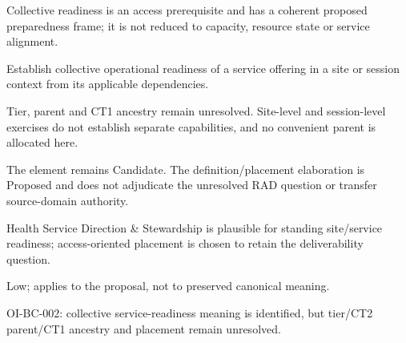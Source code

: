 Collective readiness is an access prerequisite and has a coherent proposed preparedness frame; it is not reduced to capacity, resource state or service alignment.



Establish collective operational readiness of a service offering in a site or session context from its applicable dependencies.



Tier, parent and CT1 ancestry remain unresolved. Site-level and session-level exercises do not establish separate capabilities, and no convenient parent is allocated here.



The element remains Candidate. The definition/\allowbreak{}placement elaboration is Proposed and does not adjudicate the unresolved RAD question or transfer source-domain authority.



Health Service Direction \& Stewardship is plausible for standing site/\allowbreak{}service readiness; access-oriented placement is chosen to retain the deliverability question.


Low; applies to the proposal, not to preserved canonical meaning.

OI-BC-002: collective service-readiness meaning is identified, but tier/\allowbreak{}CT2 parent/\allowbreak{}CT1 ancestry and placement remain unresolved.


